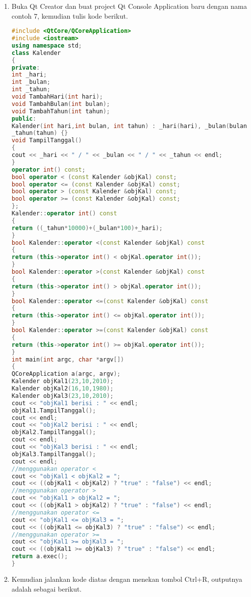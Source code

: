 \begin{enumerate}
\def\labelenumi{\arabic{enumi}.}
\item
  Buka Qt Creator dan buat project Qt Console Application baru dengan
  nama contoh 7, kemudian tulis kode berikut.

\begin{lstlisting}[language=c++]
#include <QtCore/QCoreApplication>
#include <iostream>
using namespace std;
class Kalender
{
private:
int _hari;
int _bulan;
int _tahun;
void TambahHari(int hari);
void TambahBulan(int bulan);
void TambahTahun(int tahun);
public:
Kalender(int hari,int bulan, int tahun) : _hari(hari), _bulan(bulan),
_tahun(tahun) {}
void TampilTanggal()
{
cout << _hari << " / " << _bulan << " / " << _tahun << endl;
}
operator int() const;
bool operator < (const Kalender &objKal) const;
bool operator <= (const Kalender &objKal) const;
bool operator > (const Kalender &objKal) const;
bool operator >= (const Kalender &objKal) const;
};
Kalender::operator int() const
{
return ((_tahun*10000)+(_bulan*100)+_hari);
}
bool Kalender::operator <(const Kalender &objKal) const
{
return (this->operator int() < objKal.operator int());
}
bool Kalender::operator >(const Kalender &objKal) const
{
return (this->operator int() > objKal.operator int());
}
bool Kalender::operator <=(const Kalender &objKal) const
{
return (this->operator int() <= objKal.operator int());
}
bool Kalender::operator >=(const Kalender &objKal) const
{
return (this->operator int() >= objKal.operator int());
}
int main(int argc, char *argv[])
{
QCoreApplication a(argc, argv);
Kalender objKal1(23,10,2010);
Kalender objKal2(16,10,1980);
Kalender objKal3(23,10,2010);
cout << "objKal1 berisi : " << endl;
objKal1.TampilTanggal();
cout << endl;
cout << "objKal2 berisi : " << endl;
objKal2.TampilTanggal();
cout << endl;
cout << "objKal3 berisi : " << endl;
objKal3.TampilTanggal();
cout << endl;
//menggunakan operator <
cout << "objKal1 < objKal2 = ";
cout << ((objKal1 < objKal2) ? "true" : "false") << endl;
//menggunakan operator >
cout << "objKal1 > objKal2 = ";
cout << ((objKal1 > objKal2) ? "true" : "false") << endl;
//menggunakan operator <=
cout << "objKal1 <= objKal3 = ";
cout << ((objKal1 <= objKal3) ? "true" : "false") << endl;
//menggunakan operator >=
cout << "objKal1 >= objKal3 = ";
cout << ((objKal1 >= objKal3) ? "true" : "false") << endl;
return a.exec();
}
\end{lstlisting}
\item
  Kemudian jalankan kode diatas dengan menekan tombol Ctrl+R, outputnya
  adalah sebagai berikut.
\end{enumerate}


